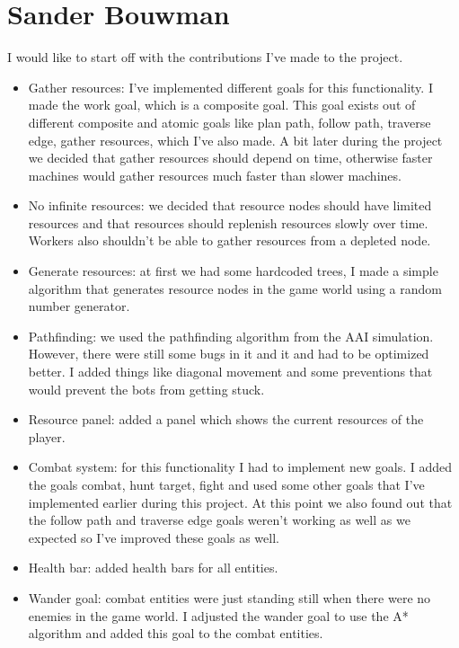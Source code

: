 \section{Sander Bouwman}
I would like to start off with the contributions I’ve made to the project.
\begin{itemize}
\item Gather resources: I’ve implemented different goals for this functionality.  I made the work goal, which is a composite goal. This goal exists out of different composite and atomic goals like plan path, follow path,  traverse edge, gather resources, which I’ve also made. A bit later during the project we decided that gather resources should depend on time, otherwise faster machines would gather resources much faster than slower machines.

\item No infinite resources: we decided that resource nodes should have limited resources and that resources should replenish resources slowly over time. Workers also shouldn't be able to gather resources from a depleted node.

\item Generate resources: at first we had some hardcoded trees, I made a simple algorithm that generates resource nodes in the game world using a random number generator.

\item Pathfinding: we used the pathfinding algorithm from the AAI simulation. However, there were still some bugs in it and it and had to be optimized better. I added things like diagonal movement and some preventions that would prevent the bots from getting stuck.

\item Resource panel: added a panel which shows the current resources of the player.
 
\item Combat system: for this functionality I had to implement new goals. I added the goals combat, hunt target, fight and used some other goals that I’ve implemented earlier during this project. At this point we also found out that the follow path and traverse edge goals weren’t working as well as we expected so I’ve improved these goals as well. 

\item Health bar: added health bars for all entities. 

\item Wander goal: combat entities were just standing still when there were no enemies in the game world. I adjusted the wander goal to use the A* algorithm and added this goal to the combat entities. 


\end{itemize}
